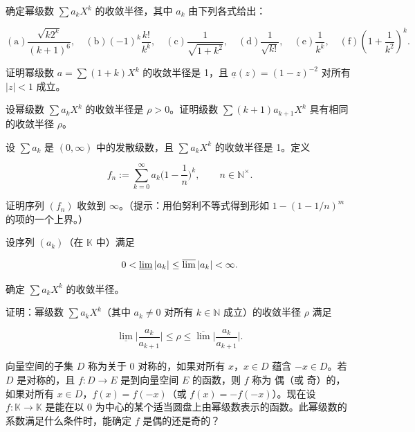 \exerciseshead

\begin{exercises}
\item

确定幂级数  $ \sum a_k X^k $ 的收敛半径，其中  $ a_k $ 由下列各式给出：

\[
\mathrm{(a)}\frac{\sqrt{k2^{k}}}{(k+1)^{6}},\quad\mathrm{(b)}\left(-1\right)^{k}\frac{k!}{k^{k}},\quad\mathrm{(c)}\frac{1}{\sqrt{1+k^{2}}},\quad\mathrm{(d)}\frac{1}{\sqrt{k!}},\quad\mathrm{(e)}\frac{1}{k^{k}},\quad\mathrm{(f)}\left(1+\frac{1}{k^{2}}\right)^{k}.
\]
\item

证明幂级数  $ a = \sum(1 + k)X^k $ 的收敛半径是 1，且  $ \underline{a}(z) = (1 - z)^{-2} $ 对所有  $ |z| < 1 $ 成立。

\item

设幂级数  $ \sum a_k X^k $ 的收敛半径是  $ \rho > 0 $。证明级数  $ \sum(k+1)a_{k+1}X^k $ 具有相同的收敛半径  $ \rho $。

\item

设  $ \sum a_k $ 是  $ (0, \infty) $ 中的发散级数，且  $ \sum a_k X^k $ 的收敛半径是 1。定义

\[
f_{n}:=\sum_{k=0}^{\infty}a_{k}\Big(1-\frac{1}{n}\Big)^{k},\qquad n\in\mathbb{N}^{\times}.
\]

证明序列  $ (f_n) $ 收敛到  $ \infty $。（提示：用伯努利不等式得到形如  $ 1 - (1 - 1/n)^m $ 的项的一个上界。）

\item

设序列  $ (a_{k}) $（在  $ \mathbb{K} $ 中）满足

\[
0<\varliminf\left|a_{k}\right|\leq\varlimsup\left|a_{k}\right|<\infty.
\]

确定  $ \sum a_k X^k $ 的收敛半径。

\item

证明：幂级数  $ \sum a_k X^k $（其中  $ a_k \neq 0 $ 对所有  $ k \in \mathbb{N} $ 成立）的收敛半径  $ \rho $ 满足

\[
\underline{\lim}\Big|\frac{a_{k}}{a_{k+1}}\Big|\leq\rho\leq\overline{\lim}\Big|\frac{a_{k}}{a_{k+1}}\Big|.
\]
\item

向量空间的子集 $D$ 称为关于 $0$ $\text{对称的}$，如果对所有 $x$，$x \in D$ 蕴含 $-x \in D$。若 $D$ 是对称的，且 $f: D \to E$ 是到向量空间 $E$ 的函数，则 $f$ 称为 $\text{偶}$（或 $\text{奇}$）的，如果对所有 $x \in D$，$f(x) = f(-x)$（或 $f(x) = -f(-x)$）。现在设 $f: \mathbb{K} \to \mathbb{K}$ 是能在以 0 为中心的某个适当圆盘上由幂级数表示的函数。此幂级数的系数满足什么条件时，能确定 $f$ 是偶的还是奇的？


\end{exercises}
